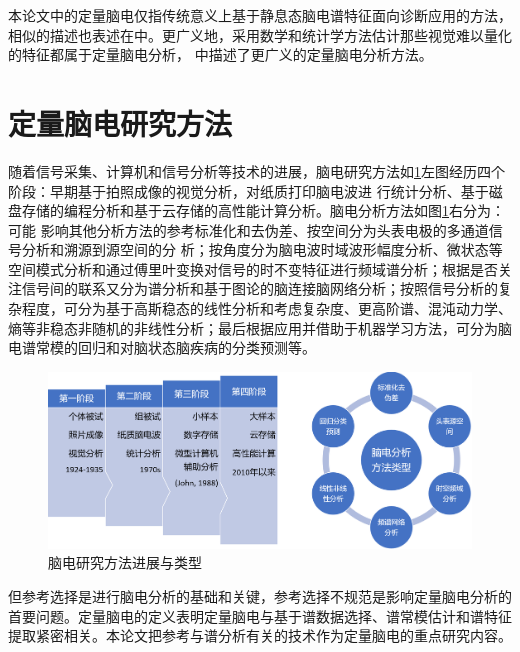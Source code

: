 本论文中的定量脑电仅指传统意义上基于静息态脑电谱特征面向诊断应用的方法，相似的描述也表述在\cite{kropotov2010quantitative,evans1999introduction,nuwer1988quantitative}中。更广义地，采用数学和统计学方法估计那些视觉难以量化的特征都属于定量脑电分析，
\cite{tong2009quantitative,majumdar2017brief}中描述了更广义的定量脑电分析方法。

\section{定量脑电研究方法}
随着信号采集、计算机和信号分析等技术的进展，脑电研究方法如\ref{evol}左图经历四个阶段：早期基于拍照成像的视觉分析，对纸质打印脑电波进
行统计分析、基于磁盘存储的编程分析和基于云存储的高性能计算分析。脑电分析方法如图\ref{evol}右分为：可能
影响其他分析方法的参考标准化和去伪差、按空间分为头表电极的多通道信号分析和溯源到源空间的分
析；按角度分为脑电波时域波形幅度分析、微状态等空间模式分析和通过傅里叶变换对信号的时不变特征进行频域谱分析；根据是否关注信号间的联系又分为谱分析和基于图论的脑连接脑网络分析；按照信号分析的复杂程度，可分为基于高斯稳态的线性分析和考虑复杂度、更高阶谱、混沌动力学、熵等非稳态非随机的非线性分析；最后根据应用并借助于机器学习方法，可分为脑电谱常模的回归和对脑状态脑疾病的分类预测等。
\begin{figure}[!h]
	\includegraphics[width=15cm]{pic/xulun/evolution.png}
	\caption{脑电研究方法进展与类型}
	\label{evol}
\end{figure}

但参考选择是进行脑电分析的基础和关键，参考选择不规范是影响定量脑电分析的首要问题。定量脑电的定义表明定量脑电与基于谱数据选择、谱常模估计和谱特征提取紧密相关。本论文把参考与谱分析有关的技术作为定量脑电的重点研究内容。

